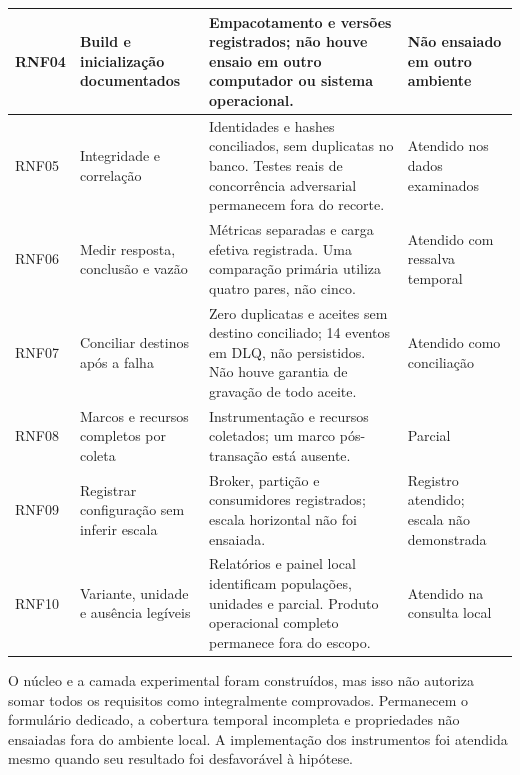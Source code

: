 {\begin{longtable}{p{}p{}p{}p{}}
RNF04 & Build e inicialização documentados & Empacotamento e versões registrados; não houve ensaio em outro computador ou sistema operacional. & Não ensaiado em outro ambiente\\ \hline
RNF05 & Integridade e correlação & Identidades e hashes conciliados, sem duplicatas no banco. Testes reais de concorrência adversarial permanecem fora do recorte. & Atendido nos dados examinados\\ \hline
RNF06 & Medir resposta, conclusão e vazão & Métricas separadas e carga efetiva registrada. Uma comparação primária utiliza quatro pares, não cinco. & Atendido com ressalva temporal\\ \hline
RNF07 & Conciliar destinos após a falha & Zero duplicatas e aceites sem destino conciliado; 14 eventos em DLQ, não persistidos. Não houve garantia de gravação de todo aceite. & Atendido como conciliação\\ \hline
RNF08 & Marcos e recursos completos por coleta & Instrumentação e recursos coletados; um marco pós-transação está ausente. & Parcial\\ \hline
RNF09 & Registrar configuração sem inferir escala & Broker, partição e consumidores registrados; escala horizontal não foi ensaiada. & Registro atendido; escala não demonstrada\\ \hline
RNF10 & Variante, unidade e ausência legíveis & Relatórios e painel local identificam populações, unidades e parcial. Produto operacional completo permanece fora do escopo. & Atendido na consulta local\\ \hline
\end{longtable}
}

O núcleo e a camada experimental foram construídos, mas isso não autoriza somar todos os requisitos como integralmente comprovados. Permanecem o formulário dedicado, a cobertura temporal incompleta e propriedades não ensaiadas fora do ambiente local. A implementação dos instrumentos foi atendida mesmo quando seu resultado foi desfavorável à hipótese.

